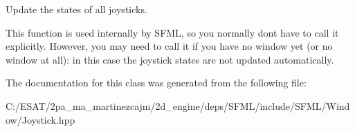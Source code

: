Update the states of all joysticks. 

This function is used internally by S\+F\+ML, so you normally don\textquotesingle{}t have to call it explicitly. However, you may need to call it if you have no window yet (or no window at all)\+: in this case the joystick states are not updated automatically. 

The documentation for this class was generated from the following file\+:\begin{DoxyCompactItemize}
\item 
C\+:/\+E\+S\+A\+T/2pa\+\_\+ma\+\_\+martinezcajm/2d\+\_\+engine/deps/\+S\+F\+M\+L/include/\+S\+F\+M\+L/\+Window/Joystick.\+hpp\end{DoxyCompactItemize}
